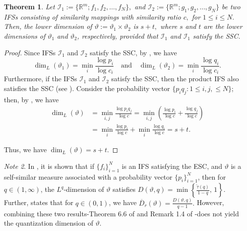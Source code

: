 \documentclass{amsproc}
\newtheorem{theorem}{Theorem}[section]
\theoremstyle{definition}
\theoremstyle{remark}
\newtheorem{note}[theorem]{Note}
\numberwithin{equation}{section}
\begin{document}
\begin{theorem}
    Let $\mathcal{I}_1:= \{\mathbb{R}^m; f_1,f_2,\ldots,f_N\},$ and $\mathcal{I}_2 := \{\mathbb{R}^m; g_1,g_2,\ldots,g_N\}$ be two IFSs consisting of similarity mappings with similarity ratio $c,$ for $1\le i \le N.$ Then, the lower dimension of $\vartheta := \vartheta_1 \times \vartheta_2$ is $s +t,$ where $s$ and $t$ are the lower dimensions of $\vartheta_1$ and $\vartheta_2$, respectively, provided that $\mathcal{I}_1$ and $\mathcal{I}_1$ satisfy the SSC.
\end{theorem}
\begin{proof}
    Since IFSs $\mathcal{I}_1$ and $\mathcal{I}_2$ satisfy the SSC, by \cite[Theorem 7.4.1]{Fraser}, we have  
\[
\dim_L(\vartheta_1) = \min_{i} \frac{\log p_i}{\log c_i} \quad \text{and} \quad \dim_L(\vartheta_2) = \min_i \frac{\log q_i}{\log c_i}.
\]  
Furthermore, if the IFSs $\mathcal{I}_1$ and $\mathcal{I}_2$ satisfy the SSC, then the product IFS also satisfies the SSC (see \cite[Theorem 3.23]{VP1}). Consider the probability vector $\{p_i q_j: 1\le i,j, \le N\}$; then, by \cite[Theorem 7.4.1]{Fraser}, we have  
\[
\begin{aligned}
    \dim_L(\vartheta) &= \min_{i,j} \frac{\log p_i q_j}{\log c} = \min_{i,j} \left( \frac{\log p_i}{\log c} + \frac{\log q_j}{\log c} \right) \\
    &= \min_i \frac{\log p_i}{\log c} + \min_i \frac{\log q_i}{\log c} 
    = s + t.
\end{aligned}
\]

% 
Thus, we have $\dim_L(\vartheta) = s+t.$
\end{proof}
\begin{note}
In \cite[Theorem 6.6]{Sh1}, it is shown that if $\{f_i\}_{i=1}^N$ is an IFS satisfying the ESC, and $\vartheta$ is a self-similar measure associated with a probability vector $\{p_i\}_{i=1}^N$, then for $q \in (1, \infty)$, the $L^q$-dimension of $\vartheta$ satisfies 
$D(\vartheta, q) = \min\left\{\frac{\tilde{\tau}(q)}{1 - q},\, 1\right\}.$
Further, \cite[Remark 1.4]{KNZ1} states that for $q \in (0,1)$, we have
$\overline{D}_r(\vartheta) = \frac{D(\vartheta, q)}{q - 1}.$ However, combining these two results-Theorem 6.6 of \cite{Sh1} and Remark 1.4 of \cite{KNZ1}-does not yield the quantization dimension of $\vartheta$. 
\end{note}
\end{document}

